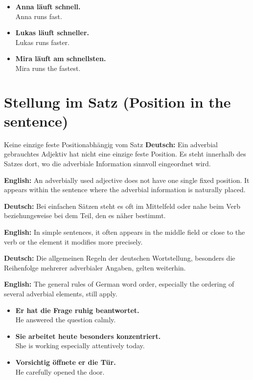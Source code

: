 \documentclass[a4paper,11pt]{article}
\newcommand{\GermanText}[1]{\textbf{Deutsch: }#1\par}
\newcommand{\EnglishText}[1]{{\small\color{SoftGray}\textbf{English: }#1\par}}
\newcommand{\ExampleItem}[2]{\item \textbf{#1}\\{\small\color{SoftGray}#2}}
\begin{document}
        \begin{exbox}
            \begin{itemize}
                \ExampleItem{Anna läuft schnell.}{Anna runs fast.}
                \ExampleItem{Lukas läuft schneller.}{Lukas runs faster.}
                \ExampleItem{Mira läuft am schnellsten.}{Mira runs the fastest.}
            \end{itemize}
        \end{exbox}

    \section{Stellung im Satz \textnormal{(Position in the sentence)}}

        \begin{grammarentry}{Keine einzige feste Position}{abhängig vom Satz}
            \GermanText{Ein adverbial gebrauchtes Adjektiv hat nicht eine einzige feste Position. Es steht innerhalb des Satzes dort, wo die adverbiale Information sinnvoll eingeordnet wird.}
            \EnglishText{An adverbially used adjective does not have one single fixed position. It appears within the sentence where the adverbial information is naturally placed.}

            \GermanText{Bei einfachen Sätzen steht es oft im Mittelfeld oder nahe beim Verb beziehungsweise bei dem Teil, den es näher bestimmt.}
            \EnglishText{In simple sentences, it often appears in the middle field or close to the verb or the element it modifies more precisely.}

            \GermanText{Die allgemeinen Regeln der deutschen Wortstellung, besonders die Reihenfolge mehrerer adverbialer Angaben, gelten weiterhin.}
            \EnglishText{The general rules of German word order, especially the ordering of several adverbial elements, still apply.}
        \end{grammarentry}

        \begin{exbox}
            \begin{itemize}
                \ExampleItem{Er hat die Frage ruhig beantwortet.}{He answered the question calmly.}
                \ExampleItem{Sie arbeitet heute besonders konzentriert.}{She is working especially attentively today.}
                \ExampleItem{Vorsichtig öffnete er die Tür.}{He carefully opened the door.}
            \end{itemize}
        \end{exbox}
\end{document}
